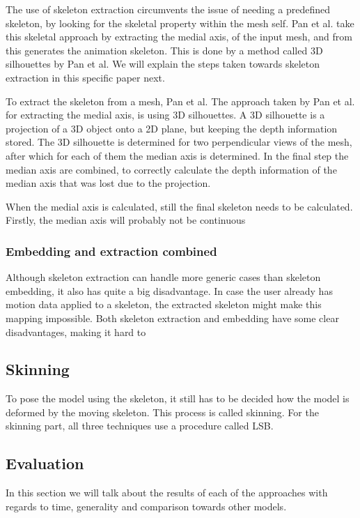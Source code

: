 \documentclass{article}
\begin{document}
The use of skeleton extraction circumvents the issue of needing a predefined
skeleton, by looking for the skeletal property within the mesh self. Pan et al.
\citep{paper2} take this skeletal approach by extracting the medial axis, of the
input mesh, and from this generates the animation skeleton. This is done by a
method called 3D silhouettes by Pan et al. We will explain the steps taken
towards skeleton extraction in this specific paper next.

To extract the skeleton from a mesh, Pan et al.  The approach taken by Pan et
al. for extracting the medial axis, is using 3D silhouettes. A 3D silhouette is
a projection of a 3D object onto a 2D plane, but keeping the depth information
stored. The 3D silhouette is determined for two perpendicular views of the mesh,
after which for each of them the median axis is determined. In the final step
the median axis are combined, to correctly calculate the depth information of
the median axis that was lost due to the projection.

When the medial axis is calculated, still the final skeleton needs to be
calculated. Firstly, the median axis will probably not be continuous 



\subsubsection{Embedding and extraction combined} Although skeleton extraction
can handle more generic cases than skeleton embedding, it also has quite a big
disadvantage. In case the user already has motion data applied to a skeleton,
the extracted skeleton might make this mapping impossible.  Both skeleton
extraction and embedding have some clear disadvantages, making it hard to 


\subsection{Skinning}
To pose the model using the skeleton, it still has to be decided how the model
is deformed by the moving skeleton. This process is called skinning. For the
skinning part, all three techniques use a procedure called LSB.


\subsection{Evaluation}
In this section we will talk about the results of each of the approaches with
regards to time, generality and comparison towards other models.
\end{document}

